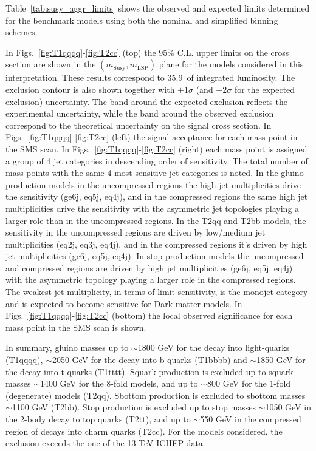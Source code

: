 Table~\ref{tab:susy_aggr_limits} shows the observed and expected limits
determined for the benchmark models using both the nominal and
simplified binning schemes. 

In Figs.~\ref{fig:T1qqqq}-\ref{fig:T2cc} (top) the 95\% C.L. upper
limits on the cross section are shown in the
$(m_{\mathrm{Susy}},m_{\mathrm{LSP}})$ plane for the models considered
in this interpretation. These results correspond to 35.9~\ifb of
integrated luminosity. The exclusion contour is also shown together
with $\pm1\sigma$ (and $\pm2\sigma$ for the expected exclusion)
uncertainty.  The band around the expected exclusion reflects the
experimental uncertainty, while the band around the observed exclusion
correspond to the theoretical uncertainty on the signal cross
section. In Figs.~\ref{fig:T1qqqq}-\ref{fig:T2cc} (left) the signal
acceptance for each mass point in the SMS scan. In
Figs.~\ref{fig:T1qqqq}-\ref{fig:T2cc} (right) each mass point is
assigned a group of 4 jet categories in descending order of
sensitivity. The total number of mass points with the same 4 most
sensitive jet categories is noted. In the gluino production models in
the uncompressed regions the high jet multiplicities drive the
sensitivity (ge6j, eq5j, eq4j), and in the compressed regions the same
high jet multiplicities drive the sensitivity with the asymmetric jet
topologies playing a larger role than in the uncompressed regions. In
the T2qq and T2bb models, the sensitivity in the uncompressed regions
are driven by low/medium jet multiplicities (eq2j, eq3j, eq4j), and in
the compressed regions it's driven by high jet multiplicities (ge6j,
eq5j, eq4j). In stop production models the uncompressed and compressed
regions are driven by high jet multiplicities (ge6j, eq5j, eq4j) with
the asymmetric topology playing a larger role in the compressed
regions.  The weakest jet multiplicity, in terms of limit sensitivity,
is the monojet category and is expected to become sensitive for Dark
matter models. In Figs.~\ref{fig:T1qqqq}-\ref{fig:T2cc} (bottom) the
local observed significance for each mass point in the SMS scan is
shown.

In summary, gluino masses up to $\sim$1800 GeV for the decay into
light-quarks (T1qqqq), $\sim$2050 GeV for the decay into b-quarks
(T1bbbb) and $\sim$1850 GeV for the decay into t-quarks
(T1tttt). Squark production is excluded up to squark masses $\sim$1400
GeV for the 8-fold models, and up to $\sim$800 GeV for the 1-fold
(degenerate) models (T2qq). Sbottom production is excluded to sbottom
masses $\sim$1100 GeV (T2bb).  Stop production is excluded up to stop
masses $\sim$1050 GeV in the 2-body decay to top quarks (T2tt), and up
to $\sim$550 GeV in the compressed region of decays into charm quarks
(T2cc).  For the models considered, the exclusion exceeds the one of
the 13 TeV ICHEP data.


